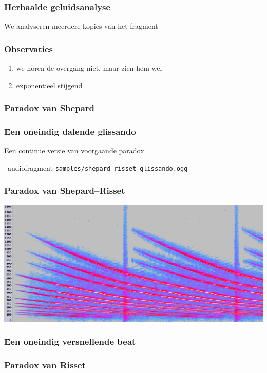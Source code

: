 \documentclass[compress, darktitle, framenumber, totalframenumber]{beamer}
\begin{document}
\begin{frame}
  \frametitle{Herhaalde geluidsanalyse}

  We analyseren meerdere kopies van het fragment
\end{frame}

\begin{frame}
  \frametitle{Observaties}

  \begin{enumerate}
    \item we horen de overgang niet, maar \alert{zien} hem wel
    \item exponenti\"eel stijgend
  \end{enumerate}
\end{frame}

\begin{frame}
  \frametitle{Paradox van Shepard}
\end{frame}

\begin{frame}
  \frametitle{Een oneindig dalende glissando}

  Een continue versie van voorgaande paradox
  \begin{block}{\twonotes\ audiofragment}
    \texttt{samples/shepard-risset-glissando.ogg}
  \end{block}
\end{frame}

\begin{frame}
  \frametitle{Paradox van Shepard--Risset}

  \includegraphics[width=\textwidth]{images/glissando-spectrum.png}
\end{frame}

\begin{frame}
  \frametitle{Een oneindig versnellende beat}
\end{frame}

\begin{frame}
  \frametitle{Paradox van Risset}
\end{frame}
\end{document}
